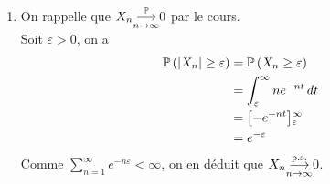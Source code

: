 {\begin{td-sol}[]
\begin{enumerate}
            \item On rappelle que \(X_n\underset{n\to\infty}{{\overset{\mathbb{P}}{\longrightarrow}}}0\) par le cours.\\
            Soit \(\varepsilon>0\), on a
            \begin{equation*}
                \begin{aligned}
                    \mathbb{P}\left(\mathopen{}\left|X_n\right|\mathclose{}\geq\varepsilon\right)
                    &=\mathbb{P}\left(X_n\geq\varepsilon\right)\\
                    &=\int_{\varepsilon}^\infty ne^{-nt}\mathop{}\!{d} t\\
                    &=\mathopen{}\left[-e^{-nt}\right]\mathclose{}_{\varepsilon}^{\infty}\\
                    &= e^{-\varepsilon}
                \end{aligned}
            \end{equation*}
            Comme \(\sum_{n=1}^\infty e^{-n\varepsilon}<\infty\), on en déduit que 
            \(X_n\underset{n\to\infty}{{\overset{\text{p.s.}}{\longrightarrow}}} 0\).
        \end{enumerate}
    \end{td-sol}
}{}